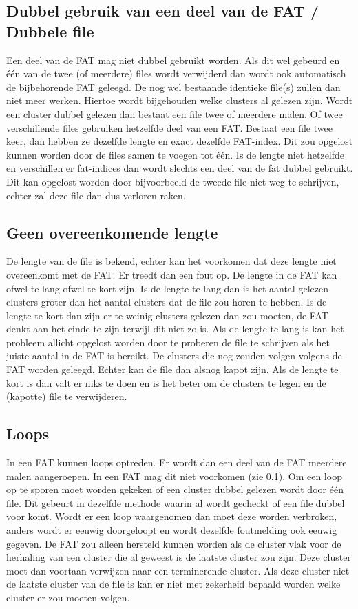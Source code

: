 \documentclass[11pt]{article}
\begin{document}
	\subsection{Dubbel gebruik van een deel van de FAT / Dubbele file}\label{sec:dubbel}
	Een deel van de FAT mag niet dubbel gebruikt worden. Als dit wel gebeurd en \'e\'en van de twee (of meerdere) files wordt verwijderd dan wordt ook automatisch de bijbehorende FAT geleegd. De nog wel bestaande identieke file(s) zullen dan niet meer werken. Hiertoe wordt bijgehouden welke clusters al gelezen zijn. Wordt een cluster dubbel gelezen dan bestaat een file twee of meerdere malen. Of twee verschillende files gebruiken hetzelfde deel van een FAT. Bestaat een file twee keer, dan hebben ze dezelfde lengte en exact dezelfde FAT-index. Dit zou opgelost kunnen worden door de files samen te voegen tot \'e\'en. Is de lengte niet hetzelfde en verschillen er fat-indices dan wordt slechts een deel van de fat dubbel gebruikt. Dit kan opgelost worden door bijvoorbeeld de tweede file niet weg te schrijven, echter zal deze file dan dus verloren raken. 

	\subsection{Geen overeenkomende lengte}\label{sec:lengte}
	De lengte van de file is bekend, echter kan het voorkomen dat deze lengte niet overeenkomt met de FAT. Er treedt dan een fout op. De lengte in de FAT kan ofwel te lang ofwel te kort zijn. Is de lengte te lang dan is het aantal gelezen clusters groter dan het aantal clusters dat de file zou horen te hebben. Is de lengte te kort dan zijn er te weinig clusters gelezen dan zou moeten, de FAT denkt aan het einde te zijn terwijl dit niet zo is. Als de lengte te lang is kan het probleem allicht opgelost worden door te proberen de file te schrijven als het juiste aantal in de FAT is bereikt. De clusters die nog zouden volgen volgens de FAT worden geleegd. Echter kan de file dan alsnog kapot zijn. Als de lengte te kort is dan valt er niks te doen en is het beter om de clusters te legen en de (kapotte) file te verwijderen.

	\subsection{Loops}\label{sec:loops}
	In een FAT kunnen loops optreden. Er wordt dan een deel van de FAT meerdere malen aangeroepen. In een FAT mag dit niet voorkomen (zie \ref{sec:dubbel}). Om een loop op te sporen moet worden gekeken of een cluster dubbel gelezen wordt door \'e\'en file. Dit gebeurt in dezelfde methode waarin al wordt gecheckt of een file dubbel voor komt. Wordt er een loop waargenomen dan moet deze worden verbroken, anders wordt er eeuwig doorgeloopt en wordt dezelfde foutmelding ook eeuwig gegeven. De FAT zou alleen hersteld kunnen worden als de cluster vlak voor de herhaling van een cluster die al geweest is de laatste cluster zou zijn. Deze cluster moet dan voortaan verwijzen naar een terminerende cluster. Als deze cluster niet de laatste cluster van de file is kan er niet met zekerheid bepaald worden welke cluster er zou moeten volgen.
\end{document}
